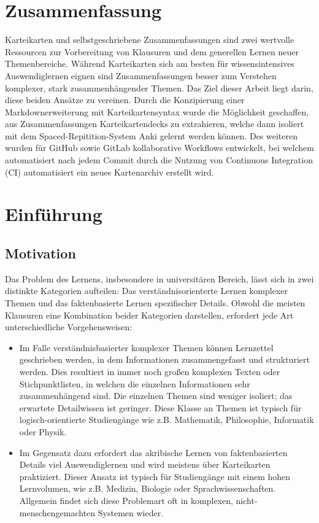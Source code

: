 \documentclass[ngerman]{article}
\begin{document}
\maketitle
\section*{Zusammenfassung}
Karteikarten und selbstgeschriebene Zusammenfassungen sind zwei wertvolle Ressourcen zur Vorbereitung von Klausuren und dem generellen Lernen neuer Themenbereiche. Während Karteikarten sich am besten für wissensintensives Auswendiglernen eignen sind Zusammenfassungen besser zum Verstehen komplexer, stark zusammenhängender Themen. Das Ziel dieser Arbeit liegt darin, diese beiden Ansätze zu vereinen. Durch die Konzipierung einer Markdownerweiterung mit Karteikartensyntax wurde die Möglichkeit geschaffen, aus Zusammenfassungen Karteikartendecks zu extrahieren, welche dann isoliert mit dem Spaced-Repitition-System Anki gelernt werden können. Des weiteren wurden für GitHub sowie GitLab kollaborative Workflows entwickelt, bei welchem automatisiert nach jedem Commit durch die Nutzung von Continuous Integration (CI) automatisiert ein neues Kartenarchiv erstellt wird.
\tableofcontents
\newpage


\section{Einführung}
\subsection{Motivation}
Das Problem des Lernens, insbesondere in universitären Bereich, lässt sich in zwei distinkte Kategorien aufteilen: Das verständnisorienterte Lernen komplexer Themen und das faktenbasierte Lernen spezifischer Details. Obwohl die meisten Klausuren eine Kombination beider Kategorien darstellen, erfordert jede Art unterschiedliche Vorgehensweisen:

\begin{itemize}
\item Im Falle verständnisbasierter komplexer Themen können Lernzettel geschrieben werden, in dem Informationen zusammengefasst und strukturiert werden. Dies resultiert in immer noch großen komplexen Texten oder Stichpunktlisten, in welchen die einzelnen Informationen sehr zusammenhängend sind. Die einzelnen Themen sind weniger isoliert; das erwartete Detailwissen ist geringer. Diese Klasse an Themen ist typisch für logisch-orientierte Studiengänge wie z.B. Mathematik, Philosophie, Informatik oder Physik.
\item Im Gegensatz dazu erfordert das akribische Lernen von faktenbasierten Details viel Auswendiglernen und wird meistens über Karteikarten praktiziert. Dieser Ansatz ist typisch für Studiengänge mit einem hohen Lernvolumen, wie z.B. Medizin, Biologie oder Sprachwissenschaften. Allgemein findet sich diese Problemart oft in komplexen, nicht-menschengemachten Systemen wieder.
\end{itemize}
\end{document}
